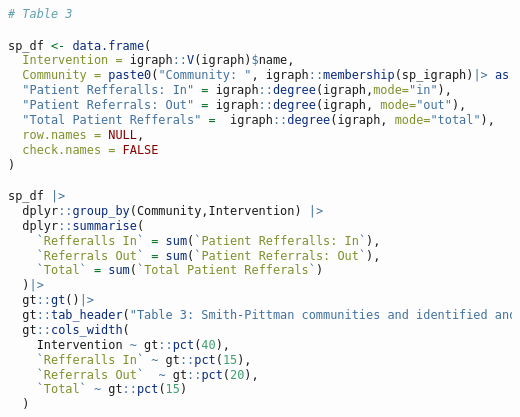 \documentclass{article}
\begin{document}
\begin{lstlisting}[language=R]
# Table 3

sp_df <- data.frame(
  Intervention = igraph::V(igraph)$name,
  Community = paste0("Community: ", igraph::membership(sp_igraph)|> as.vector()),
  "Patient Refferalls: In" = igraph::degree(igraph,mode="in"),
  "Patient Referrals: Out" = igraph::degree(igraph, mode="out"),
  "Total Patient Refferals" =  igraph::degree(igraph, mode="total"),
  row.names = NULL,
  check.names = FALSE
)

sp_df |>
  dplyr::group_by(Community,Intervention) |> 
  dplyr::summarise(
    `Refferalls In` = sum(`Patient Refferalls: In`),
    `Referrals Out` = sum(`Patient Referrals: Out`),
    `Total` = sum(`Total Patient Refferals`)
  )|>
  gt::gt()|>
  gt::tab_header("Table 3: Smith-Pittman communities and identified and grouped interventions.")|>
  gt::cols_width(
    Intervention ~ gt::pct(40),
    `Refferalls In` ~ gt::pct(15),
    `Referrals Out`  ~ gt::pct(20),
    `Total` ~ gt::pct(15)
  )
\end{lstlisting}
\end{document}
